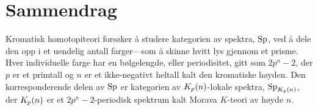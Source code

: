 




\newpage 
\section*{Sammendrag}

Kromatisk homotopiteori forsøker å studere kategorien av spektra, $\mathrm{Sp}$, ved å dele den opp i et uendelig antall farger---som å skinne hvitt lys gjennom et prisme. Hver individuelle farge har en bølgelengde, eller periodisitet, gitt som $2p^n-2$, der $p$ er et primtall og $n$ er et ikke-negativt heltall kalt den kromatiske høyden. Den korresponderende delen av $\mathrm{Sp}$ er kategorien av ${K_p(n)}$-lokale spektra, $\mathrm{Sp}_{K_p(n)}$, der ${K_p(n)}$ er et $2p^n-2$-periodisk spektrum kalt Morava $K$-teori av høyde $n$. 

